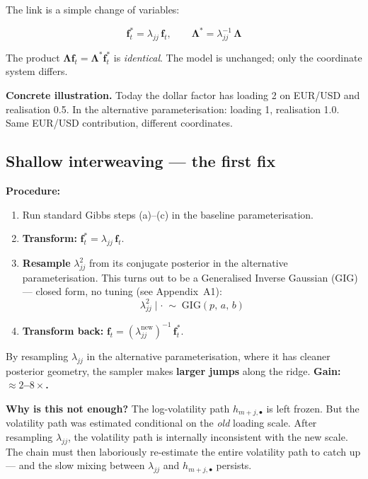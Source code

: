 \documentclass[11pt, a4paper]{article}\usepackage[]{graphicx}\usepackage[]{xcolor}
\begin{document}
The link is a simple change of variables:

\begin{formulabox}
\[
  \mathbf{f}_t^* = \lambda_{jj}\,\mathbf{f}_t,
  \qquad
  \boldsymbol{\Lambda}^* = \lambda_{jj}^{-1}\,\boldsymbol{\Lambda}
\]
\end{formulabox}

The product $\boldsymbol{\Lambda}\mathbf{f}_t = \boldsymbol{\Lambda}^*
\mathbf{f}_t^*$ is \textit{identical}.  The model is unchanged; only the
coordinate system differs.

\textbf{Concrete illustration.}  Today the dollar factor has loading 2 on
EUR/USD and realisation 0.5.  In the alternative parameterisation: loading 1,
realisation 1.0.  Same EUR/USD contribution, different coordinates.

\subsection{Shallow interweaving --- the first fix}

\textbf{Procedure:}
\begin{enumerate}[itemsep=3pt]
  \item Run standard Gibbs steps (a)--(c) in the baseline parameterisation.
  \item \textbf{Transform:} $\mathbf{f}_t^* = \lambda_{jj}\,\mathbf{f}_t$.
  \item \textbf{Resample} $\lambda_{jj}^2$ from its conjugate posterior in
        the alternative parameterisation.  This turns out to be a Generalised
        Inverse Gaussian (GIG) --- closed form, no tuning (see Appendix~A1):
        \[
          \lambda_{jj}^2 \mid \cdot \;\sim\; \mathrm{GIG}(p,\, a,\, b)
        \]
  \item \textbf{Transform back:}
        $\mathbf{f}_t = (\lambda_{jj}^{\mathrm{new}})^{-1}\,\mathbf{f}_t^*$.
\end{enumerate}

By resampling $\lambda_{jj}$ in the alternative parameterisation, where it has
cleaner posterior geometry, the sampler makes \textbf{larger jumps} along the
ridge.  \textbf{Gain: $\approx 2$--$8\times$.}

\textbf{Why is this not enough?}  The log-volatility path $h_{m+j,\bullet}$
is left frozen.  But the volatility path was estimated conditional on the
\textit{old} loading scale.  After resampling $\lambda_{jj}$, the volatility
path is internally inconsistent with the new scale.  The chain must then
laboriously re-estimate the entire volatility path to catch up --- and the
slow mixing between $\lambda_{jj}$ and $h_{m+j,\bullet}$ persists.
\end{document}
